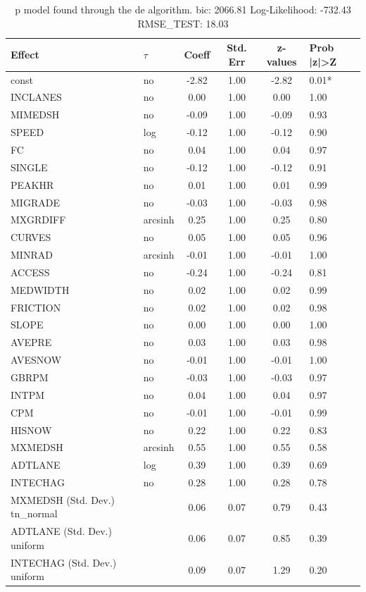 \begin{table}
	\caption{p model found through the de algorithm. bic: 2066.81 Log-Likelihood: -732.43 RMSE_TEST: 18.03}
	\begin{center}
		\begin{tabular}{|l|l|c|c|c|l|}
			\hline
			Effect & $\tau$ & Coeff & Std. Err & z-values & Prob |z|>Z \\
			\hline
			const & no & -2.82 & 1.00 & -2.82 & 0.01* \\
			\hline
			INCLANES & no & 0.00 & 1.00 & 0.00 & 1.00 \\
			\hline
			MIMEDSH & no & -0.09 & 1.00 & -0.09 & 0.93 \\
			\hline
			SPEED & log & -0.12 & 1.00 & -0.12 & 0.90 \\
			\hline
			FC & no & 0.04 & 1.00 & 0.04 & 0.97 \\
			\hline
			SINGLE & no & -0.12 & 1.00 & -0.12 & 0.91 \\
			\hline
			PEAKHR & no & 0.01 & 1.00 & 0.01 & 0.99 \\
			\hline
			MIGRADE & no & -0.03 & 1.00 & -0.03 & 0.98 \\
			\hline
			MXGRDIFF & arcsinh & 0.25 & 1.00 & 0.25 & 0.80 \\
			\hline
			CURVES & no & 0.05 & 1.00 & 0.05 & 0.96 \\
			\hline
			MINRAD & arcsinh & -0.01 & 1.00 & -0.01 & 1.00 \\
			\hline
			ACCESS & no & -0.24 & 1.00 & -0.24 & 0.81 \\
			\hline
			MEDWIDTH & no & 0.02 & 1.00 & 0.02 & 0.99 \\
			\hline
			FRICTION & no & 0.02 & 1.00 & 0.02 & 0.98 \\
			\hline
			SLOPE & no & 0.00 & 1.00 & 0.00 & 1.00 \\
			\hline
			AVEPRE & no & 0.03 & 1.00 & 0.03 & 0.98 \\
			\hline
			AVESNOW & no & -0.01 & 1.00 & -0.01 & 1.00 \\
			\hline
			GBRPM & no & -0.03 & 1.00 & -0.03 & 0.97 \\
			\hline
			INTPM & no & 0.04 & 1.00 & 0.04 & 0.97 \\
			\hline
			CPM & no & -0.01 & 1.00 & -0.01 & 0.99 \\
			\hline
			HISNOW & no & 0.22 & 1.00 & 0.22 & 0.83 \\
			\hline
			MXMEDSH & arcsinh & 0.55 & 1.00 & 0.55 & 0.58 \\
			\hline
			ADTLANE & log & 0.39 & 1.00 & 0.39 & 0.69 \\
			\hline
			INTECHAG & no & 0.28 & 1.00 & 0.28 & 0.78 \\
			\hline
			MXMEDSH (Std. Dev.) tn_normal &  & 0.06 & 0.07 & 0.79 & 0.43 \\
			\hline
			ADTLANE (Std. Dev.) uniform &  & 0.06 & 0.07 & 0.85 & 0.39 \\
			\hline
			INTECHAG (Std. Dev.) uniform &  & 0.09 & 0.07 & 1.29 & 0.20 \\
			\hline
		\end{tabular}
	\end{center}
\end{table}